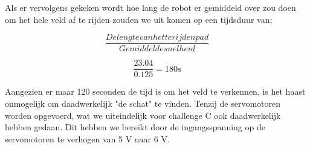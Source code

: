 \documentclass{report}
\begin{document}
Als er vervolgens gekeken wordt hoe lang de robot er gemiddeld over zou doen om het hele veld af te rijden zouden we uit komen op een tijdsduur van;
\newline

\begin{equation}
\frac{De lengte van het te rijden pad}{Gemiddelde snelheid}
\end{equation}

\begin{equation}
\frac{23.04}{0.125} = 180 \mathrm{s}
\end{equation}

Aangezien er maar 120 seconden de tijd is om het veld te verkennen, is het haast onmogelijk om daadwerkelijk "de schat" te vinden. Tenzij de servomotoren worden opgevoerd, wat we uiteindelijk voor challenge C ook daadwerkelijk hebben gedaan. Dit hebben we bereikt door de ingangsspanning op de servomotoren te verhogen van 5 V naar 6 V.
\end{document}
